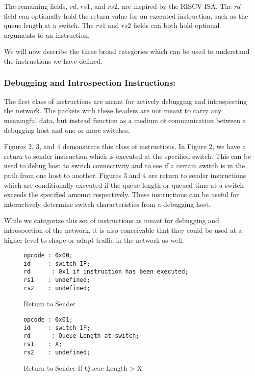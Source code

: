 The remaining fields, $rd$, $rs1$, and $rs2$, are inspired by the RISCV ISA. The $rd$ field can optionally hold the return value for an executed instruction, such as the queue length at a switch. The $rs1$ and $rs2$ fields can both hold optional arguments to an instruction. 

We will now describe the three broad categories which can be used to understand the instructions we have defined.

\subsubsection{Debugging and Introspection Instructions: }

The first class of instructions are meant for actively debugging and introspecting the network. The packets with these headers are not meant to carry any meaningful data, but instead function as a medium of communication between a debugging host and one or more switches. 

Figures 2, 3, and 4 demonstrate this class of instructions. In Figure 2, we have a return to sender instruction which is executed at the specified switch. This can be used to debug host to switch connectivity and to see if a certain switch is in the path from one host to another. Figures 3 and 4 are return to sender instructions which are conditionally executed if the queue length or queued time at a switch exceeds the specified amount respectively. These instructions can be useful for interactively determine switch characteristics from a debugging host. 

While we categorize this set of instructions as meant for debugging and introspection of the network, it is also conceivable that they could be used at a higher level to shape or adapt traffic in the network as well.

\begin{figure}[tp]
\centering
\begin{verbatim}
opcode : 0x00;
id     : switch IP;
rd	    : 0x1 if instruction has been executed;
rs1	   : undefined;
rs2	   : undefined;
\end{verbatim}
\caption{Return to Sender}
\end{figure}

\begin{figure}[tp]
\centering
\begin{verbatim}
opcode : 0x01;
id     : switch IP;
rd	    : Queue Length at switch;
rs1	   : X;
rs2	   : undefined;
\end{verbatim}
\caption{Return to Sender If Queue Length > X}
\end{figure}

